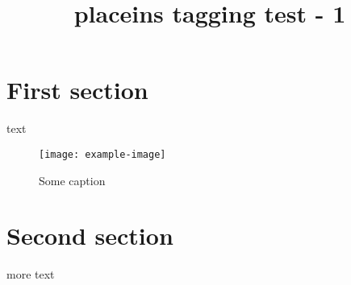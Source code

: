 \documentclass{article}
\title{placeins tagging test - 1}
\begin{document}
\section{First section}
text
\begin{figure}[!b]
\centering
\texttt{[image: example-image]}
\caption{Some caption}
\end{figure}
\section{Second section}
more text
\end{document}
